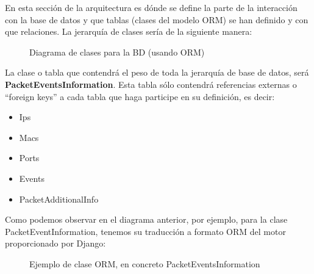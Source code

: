 En esta sección de la arquitectura es dónde se define la parte de la interacción con la base de datos y que tablas (clases del modelo ORM) se han definido y con que relaciones. La jerarquía de clases sería de la siguiente manera: \\
\newpage
\begin{figure}[H]
\caption{Diagrama de clases para la BD (usando ORM)}
\end{figure}

La clase o tabla que contendrá el peso de toda la jerarquía de base de datos, será \textbf{PacketEventsInformation}. Esta tabla sólo contendrá referencias externas o ``foreign keys'' a cada tabla que haga participe en su definición, es decir:
\begin{itemize}
\item Ips
\item Macs
\item Ports
\item Events
\item PacketAdditionalInfo
\end{itemize}

Como podemos observar en el diagrama anterior, por ejemplo, para la clase PacketEventInformation, tenemos su traducción a formato ORM del motor proporcionado por Django:

\begin{figure}[H]

\caption{Ejemplo de clase ORM, en concreto PacketEventsInformation}
\end{figure}

